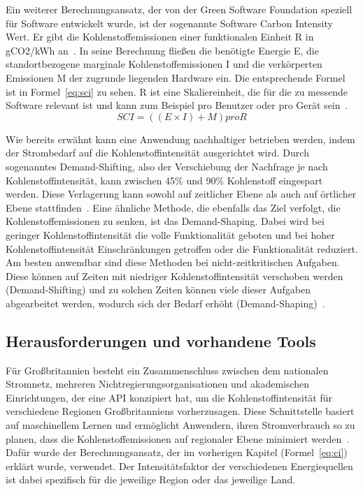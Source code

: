 Ein weiterer Berechnungsansatz, der von der Green Software Foundation speziell für Software entwickelt wurde, ist der sogenannte Software Carbon Intensity Wert.
Er gibt die Kohlenstoffemissionen einer funktionalen Einheit R in gCO2/kWh an~\cite{GreenSoftwareFoundation.2022}.
In seine Berechnung fließen die benötigte Energie E, die standortbezogene marginale Kohlenstoffemissionen I und die verkörperten Emissionen M der zugrunde liegenden Hardware ein.
Die entsprechende Formel ist in Formel~\ref{eq:sci} zu sehen.
R ist eine Skaliereinheit, die für die zu messende Software relevant ist und kann zum Beispiel pro Benutzer oder pro Gerät sein~\cite{Buchanan.2023}.
\begin{equation}
 \label{eq:sci}
 SCI = ((E \times I) + M) pro R
\end{equation}

Wie bereits erwähnt kann eine Anwendung nachhaltiger betrieben werden, indem der Strombedarf auf die Kohlenstoffintensität ausgerichtet wird.
Durch sogenanntes Demand-Shifting, also der Verschiebung der Nachfrage je nach Kohlenstoffintensität, kann zwischen 45\% und 90\% Kohlenstoff eingespart werden.
Diese Verlagerung kann sowohl auf zeitlicher Ebene als auch auf örtlicher Ebene stattfinden~\cite{GreenSoftwareFoundation.2022}.
Eine ähnliche Methode, die ebenfalls das Ziel verfolgt, die Kohlenstoffemissionen zu senken, ist das Demand-Shaping.
Dabei wird bei geringer Kohlenstoffintensität die volle Funktionalität geboten und bei hoher Kohlenstoffintensität Einschränkungen getroffen oder die Funktionalität reduziert.
Am besten anwendbar sind diese Methoden bei nicht-zeitkritischen Aufgaben.
Diese können auf Zeiten mit niedriger Kohlenstoffintensität verschoben werden (Demand-Shifting) und zu solchen Zeiten können viele dieser Aufgaben abgearbeitet werden, wodurch sich der Bedarf erhöht (Demand-Shaping)~\cite{Currie.2024}.

\subsection{Herausforderungen und vorhandene Tools}
Für Großbritannien besteht ein Zusammenschluss zwischen dem nationalen Stromnetz, mehreren Nichtregierungsorganisationen und akademischen Einrichtungen, der eine API konzipiert hat, um die Kohlenstoffintensität für verschiedene Regionen Großbritanniens vorherzusagen.
Diese Schnittstelle basiert auf maschinellem Lernen und ermöglicht Anwendern, ihren Stromverbrauch so zu planen, dass die Kohlenstoffemissionen auf regionaler Ebene minimiert werden~\cite{Currie.2024}.
Dafür wurde der Berechnungsansatz, der im vorherigen Kapitel (Formel~\ref{eq:ci}) erklärt wurde, verwendet.
Der Intensitätsfaktor der verschiedenen Energiequellen ist dabei spezifisch für die jeweilige Region oder das jeweilige Land.

